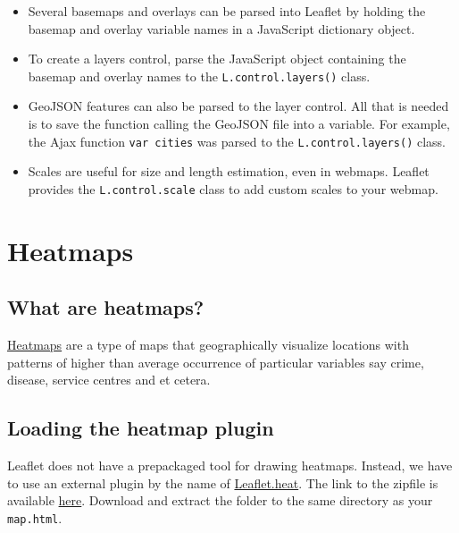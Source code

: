 \documentclass[
]{book}
\begin{document}
\begin{itemize}
\item
  Several basemaps and overlays can be parsed into Leaflet by holding the basemap and overlay variable names in a JavaScript dictionary object.
\item
  To create a layers control, parse the JavaScript object containing the basemap and overlay names to the \texttt{L.control.layers()} class.
\item
  GeoJSON features can also be parsed to the layer control. All that is needed is to save the function calling the GeoJSON file into a variable. For example, the Ajax function \texttt{var\ cities} was parsed to the \texttt{L.control.layers()} class.
\item
  Scales are useful for size and length estimation, even in webmaps. Leaflet provides the \texttt{L.control.scale} class to add custom scales to your webmap.
\end{itemize}

\hypertarget{heatmaps}{%
\chapter{Heatmaps}\label{heatmaps}}

\hypertarget{what-are-heatmaps}{%
\section{What are heatmaps?}\label{what-are-heatmaps}}

\href{https://www.gislounge.com/heat-maps-in-gis/}{Heatmaps} are a type of maps that geographically visualize locations with patterns of higher than average occurrence of particular variables say crime, disease, service centres and et cetera.

\hypertarget{loading-the-heatmap-plugin}{%
\section{Loading the heatmap plugin}\label{loading-the-heatmap-plugin}}

Leaflet does not have a prepackaged tool for drawing heatmaps. Instead, we have to use an external plugin by the name of \href{https://github.com/Leaflet/Leaflet.heat}{Leaflet.heat}. The link to the zipfile is available \href{https://codeload.github.com/Leaflet/Leaflet.heat/zip/refs/heads/gh-pages}{here}. Download and extract the folder to the same directory as your \texttt{map.html}.
\end{document}
